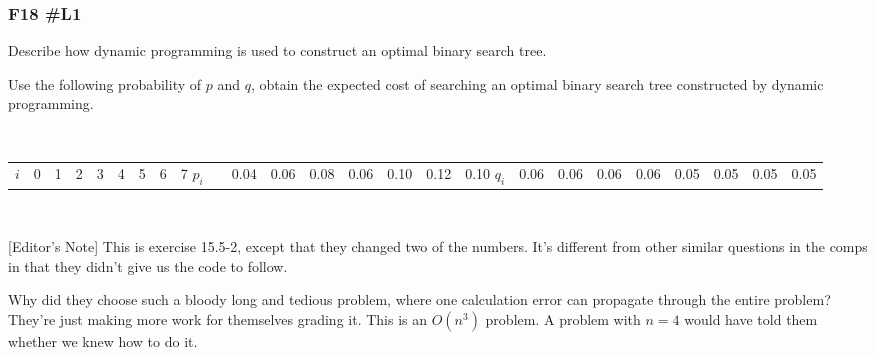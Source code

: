 \vskip 24pt


\subsubsection{F18 \#L1}

	Describe how dynamic programming is used to construct an optimal binary search tree.  
	
	Use the following probability of $p$ and $q$, obtain the expected cost of searching an optimal binary search tree constructed by dynamic programming.  

	\
	
\hfil	\begin{tabular}{*9{|r}|}
		\hline
		$i$ & 0 & 1 & 2 & 3 & 4 & 5 & 6 & 7 \cr\hline
		$p_i$ & & 0.04 & 0.06 & 0.08 & 0.06 & 0.10 & 0.12 & 0.10 \cr\hline
		$q_i$ & 0.06 & 0.06 & 0.06 & 0.06 & 0.05 & 0.05 & 0.05 & 0.05 \cr\hline
	\end{tabular}
	
\

[Editor's Note] This is exercise 15.5-2, except that they changed two of the numbers.  It's different from other similar questions in the comps in that they didn't give us the code to follow.  

Why did they choose such a bloody long and tedious problem, where one calculation error can propagate through the entire problem?  They're just making more work for themselves grading it.  This is an $O(n^3)$ problem.  A problem with $n=4$ would have told them whether we knew how to do it.  

